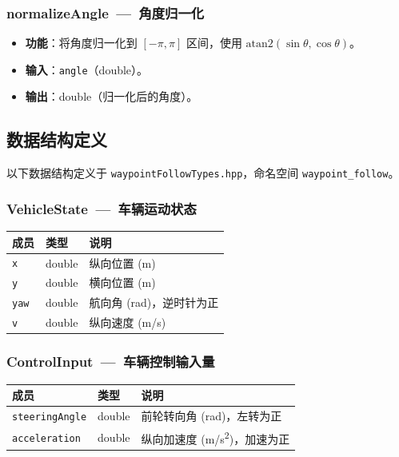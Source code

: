 \documentclass[a4paper,10pt]{article}
\begin{document}
\subsubsection{normalizeAngle~---~角度归一化}

\begin{itemize}
  \item \textbf{功能}：将角度归一化到 $[-\pi, \pi]$ 区间，使用 $\text{atan2}(\sin\theta, \cos\theta)$。
  \item \textbf{输入}：\texttt{angle}（double）。
  \item \textbf{输出}：double（归一化后的角度）。
\end{itemize}

\subsection{数据结构定义}

以下数据结构定义于 \texttt{waypointFollowTypes.hpp}，命名空间 \texttt{waypoint\_follow}。

\subsubsection{VehicleState~---~车辆运动状态}
\begin{longtable}{|L{3.5cm}|C{2cm}|L{9.5cm}|}
\hline
\textbf{成员} & \textbf{类型} & \textbf{说明} \\
\hline
\texttt{x} & double & 纵向位置 (m) \\
\hline
\texttt{y} & double & 横向位置 (m) \\
\hline
\texttt{yaw} & double & 航向角 (rad)，逆时针为正 \\
\hline
\texttt{v} & double & 纵向速度 (m/s) \\
\hline
\end{longtable}

\subsubsection{ControlInput~---~车辆控制输入量}
\begin{longtable}{|L{3.5cm}|C{2cm}|L{9.5cm}|}
\hline
\textbf{成员} & \textbf{类型} & \textbf{说明} \\
\hline
\texttt{steeringAngle} & double & 前轮转向角 (rad)，左转为正 \\
\hline
\texttt{acceleration} & double & 纵向加速度 (m/s\textsuperscript{2})，加速为正 \\
\hline
\end{longtable}
\end{document}
